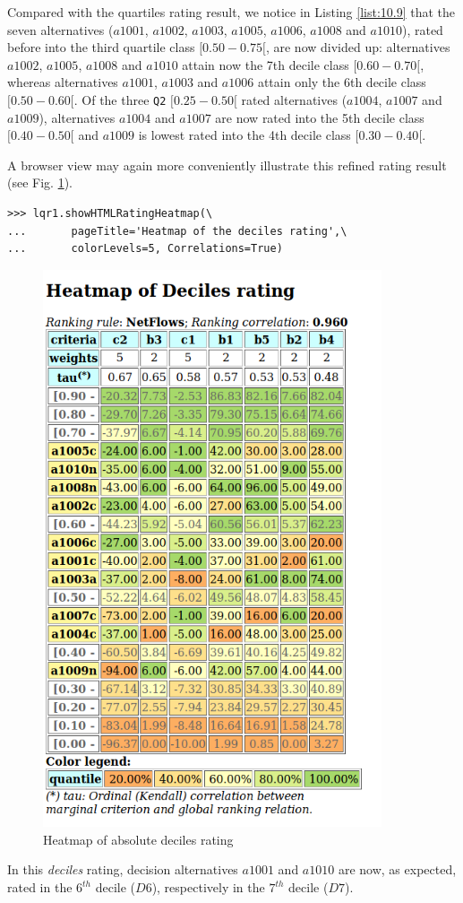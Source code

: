 Compared with the quartiles rating result, we notice in Listing \ref{list:10.9} that the seven alternatives ($a1001$, $a1002$, $a1003$, $a1005$, $a1006$, $a1008$ and $a1010$), rated before into the third quartile class $[0.50-0.75[$, are now divided up: alternatives $a1002$, $a1005$, $a1008$ and $a1010$ attain now the 7th decile class $[0.60-0.70[$, whereas alternatives $a1001$, $a1003$ and $a1006$ attain only the 6th decile class $[0.50-0.60[$. Of the three \texttt{Q2} $[0.25-0.50[$ rated alternatives ($a1004$, $a1007$ and $a1009$), alternatives $a1004$ and $a1007$ are now rated into the 5th decile class $[0.40-0.50[$ and $a1009$ is lowest rated into the 4th decile class $[0.30-0.40[$.

A browser view may again more conveniently illustrate this refined rating result (see Fig. \ref{fig:10.4}).

\begin{lstlisting}
>>> lqr1.showHTMLRatingHeatmap(\
...       pageTitle='Heatmap of the deciles rating',\
...       colorLevels=5, Correlations=True)
\end{lstlisting}

\begin{figure}[h]
\includegraphics[width=10cm]{Figures/heatMap2.png}
\caption{Heatmap of absolute deciles rating}
\label{fig:10.4}       %
\end{figure}
\clearpage
In this \emph{deciles} rating, decision alternatives $a1001$ and $a1010$ are now, as expected, rated in the $6^{th}$ decile ($D6$), respectively in the $7^{th}$ decile ($D7$).

